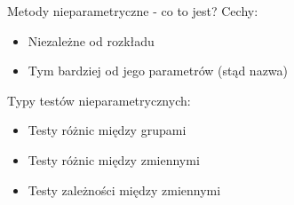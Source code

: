 \begin{frame}{Metody nieparametryczne - co to jest?}
	Cechy:
	\begin{itemize}
		\item Niezależne od rozkładu
		\item Tym bardziej od jego parametrów (stąd nazwa)
	\end{itemize}
	Typy testów nieparametrycznych:
	\begin{itemize}
		\item Testy różnic między grupami
		\item Testy różnic między zmiennymi
		\item Testy zależności między zmiennymi
	\end{itemize}
\end{frame}